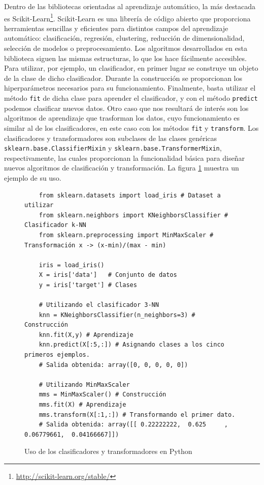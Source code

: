 Dentro de las bibliotecas orientadas al aprendizaje automático, la más destacada es Scikit-Learn\footnote{\url{http://scikit-learn.org/stable/}}. Scikit-Learn es una librería de código abierto que proporciona herramientas sencillas y eficientes para distintos campos del aprendizaje automático: clasificación, regresión, clustering, reducción de dimensionalidad, selección de modelos o preprocesamiento. Los algoritmos desarrollados en esta biblioteca siguen las mismas estructuras, lo que los hace fácilmente accesibles. Para utilizar, por ejemplo, un clasificador, en primer lugar se construye un objeto de la clase de dicho clasificador. Durante la construcción se proporcionan los hiperparámetros necesarios para su funcionamiento. Finalmente, basta utilizar el método \texttt{fit} de dicha clase para aprender el clasificador, y con el método \texttt{predict} podemos clasificar nuevos datos. Otro caso que nos resultará de interés son los algoritmos de aprendizaje que trasforman los datos, cuyo funcionamiento es similar al de los clasificadores, en este caso con los métodos \texttt{fit} y \texttt{transform}. Los clasificadores y transformadores son subclases de las clases genéricas \texttt{sklearn.base.ClassifierMixin} y \texttt{sklearn.base.TransformerMixin}, respectivamente, las cuales proporcionan la funcionalidad básica para diseñar nuevos algoritmos de clasificación y transformación. La figura \ref{fig:ex_clf_trf_python} muestra un ejemplo de su uso.

\begin{figure}[h]
\begin{verbatim}
    from sklearn.datasets import load_iris # Dataset a utilizar
    from sklearn.neighbors import KNeighborsClassifier # Clasificador k-NN
    from sklearn.preprocessing import MinMaxScaler # Transformación x -> (x-min)/(max - min)

    iris = load_iris()
    X = iris['data']   # Conjunto de datos
    y = iris['target'] # Clases

    # Utilizando el clasificador 3-NN
    knn = KNeighborsClassifier(n_neighbors=3) # Construcción
    knn.fit(X,y) # Aprendizaje
    knn.predict(X[:5,:]) # Asignando clases a los cinco primeros ejemplos.
    # Salida obtenida: array([0, 0, 0, 0, 0])

    # Utilizando MinMaxScaler
    mms = MinMaxScaler() # Construcción
    mms.fit(X) # Aprendizaje
    mms.transform(X[:1,:]) # Transformando el primer dato.
    # Salida obtenida: array([[ 0.22222222,  0.625     ,  0.06779661,  0.04166667]])

\end{verbatim}
\caption{Uso de los clasificadores y transformadores en Python} \label{fig:ex_clf_trf_python}
\end{figure}


